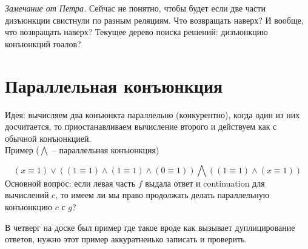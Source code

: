\documentclass[a5paper,12pt]{article}
\begin{document}
\textit{Замечание от Петра. } Сейчас не понятно, чтобы будет если две части дизъюнкции свистнули по разным реляциям. Что возвращать наверх? И вообще, что возвращать наверх? Текущее дерево поиска решений: дизъюнкцию конъюнкций гоалов?


\section{Параллельная конъюнкция}
Идея: вычисляем два конъюнкта параллельно (конкурентно), когда один из них досчитается, то приостанавливаем вычисление второго и действуем как с обычной конъюнкцией.\\

Пример ($\bigwedge$ -- параллельная конъюнкция)

$$
(x\equiv 1) \vee ((1\equiv 1) \wedge (1\equiv 1) \wedge (0\equiv 1)) \bigwedge ( (1\equiv 1) \wedge (x\equiv 1))
$$
Основной вопрос: если левая часть $f$ выдала ответ и continuation для вычислений $c$, то имеем ли мы право продолжать делать параллельную конъюнкцию $c$ с $g$?

В четверг на доске был пример где такое вроде как вызывает дуплицирование ответов, нужно этот пример аккуратненько записать и проверить.
\end{document}
